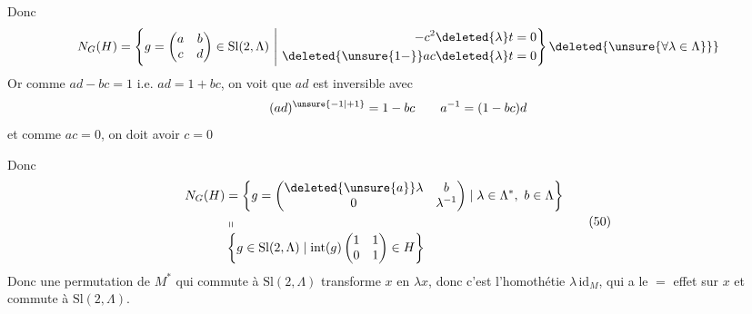 Donc
\[
N_G(H)=\left\{g=\begin{pmatrix}a&b\\c&d\end{pmatrix}\in\mathrm{Sl}(2,\Lambda)\ \middle|\ 
\begin{aligned}-c^2\deleted{\lambda}t&=0\\
\deleted{\unsure{1-}}ac\deleted{\lambda}t&=0\end{aligned}\right\}
\deleted{\unsure{\forall\lambda\in\Lambda\}}}
\]
Or 
comme $ad-bc=1$ i.e. $ad=1+bc$, on voit
que  $ad$ est inversible  avec
\[
(ad)^{\unsure{-1|+1}}=1-bc\qquad a^{-1}=(1-bc)d
\]
et comme $ac=0$, on doit avoir $c=0$

Donc
\[
\begin{aligned}
N_G(H)&=\left\{g=\begin{pmatrix}\deleted{\unsure{a}}\lambda&b\\0&\lambda^{-1}\end{pmatrix}\mid\lambda\in\Lambda^*,\ b\in\Lambda\right\}\\
&\shortparallel\\[-3pt]
&\left\{g\in\mathrm{Sl}(2,\Lambda)\mid\operatorname{int}(g)\begin{pmatrix}1&1\\0&1\end{pmatrix}\in H\right\}
\end{aligned}\tag*{(50)}
\]
Donc une  permutation de $M^*$ qui
commute à $\mathrm{Sl}(2,\Lambda)$ transforme $x$ en $\lambda x$, \inserted{$(\lambda\in\Lambda^*)$}
donc c'est l'homothétie $\lambda\,\mathrm{id}_M$, qui a le
$=$ effet sur $x$ et commute à $\mathrm{Sl}(2,\Lambda)$.
